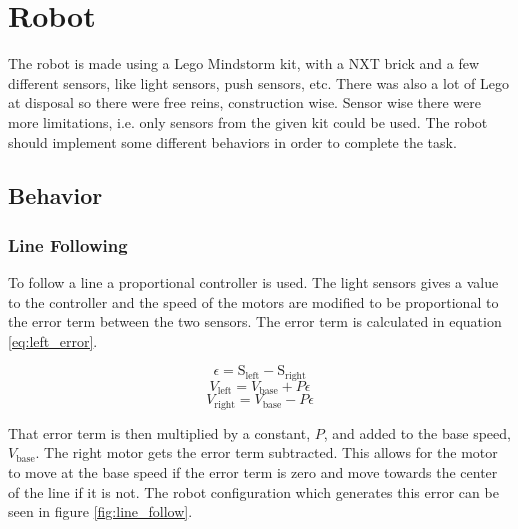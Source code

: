 \section{Robot} 

The robot is made using a Lego Mindstorm kit, with a NXT brick and a few different sensors, like light sensors, push sensors, etc. There was also a lot of Lego at disposal so there were free reins, construction wise. Sensor wise there were more limitations, i.e. only sensors from the given kit could be used. The robot should implement some different behaviors in order to complete the task.

\subsection{Behavior}

\subsubsection{Line Following}
To follow a line a proportional controller is used.
The light sensors gives a value to the controller and the speed of the motors are modified to be proportional to the error term between the two sensors.
The error term is calculated in equation \ref{eq:left_error}.

\begin{equation}
  \epsilon = \text{S}_{\text{left}} - \text{S}_{\text{right}}
 \label{eq:left_error}
\end{equation}
\begin{equation}
  V_\text{left} = V_\text{base} + P \epsilon
 \label{eq:left_speed}
\end{equation}
\begin{equation}
  V_\text{right} = V_\text{base} - P \epsilon
 \label{eq:right_speed}
\end{equation}

That error term is then multiplied by a constant, $P$, and added to the base speed, $V_\text{base}$.
The right motor gets the error term subtracted.
This allows for the motor to move at the base speed if the error term is zero and move towards the center of the line if it is not.
The robot configuration which generates this error can be seen in figure \ref{fig:line_follow}.

